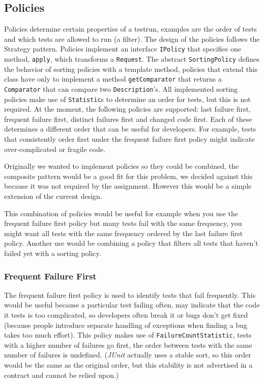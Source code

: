 \documentclass[i2]{oss}
\newcommand{\class}[1]{\texttt{#1}}
\newcommand{\method}[1]{\texttt{#1}}
\newcommand{\junit}{\emph{JUnit }}
\begin{document}

\subsection{Policies}
\label{subssec: Policies}

Policies determine certain properties of a testrun, examples are
the order of tests and which tests are allowed to run (a filter).
The design of the policies follows the Strategy pattern.
Policies implement an interface \class{IPolicy} that specifies one method,
\method{apply}, which transforms a \class{Request}.
The abstract \class{SortingPolicy} defines the behavior of sorting
policies with a template method, policies that extend this class have
only to implement a method \method{getComparator} that returns a 
\class{Comparator} that can compare two \class{Description}'s.
All implemented sorting policies make use of \class{Statistic}s to 
determine an order for tests, but this is not required.
At the moment, the following policies are supported: last failure first, 
frequent failure first, distinct failures first and changed code  first.
Each of these determines a different order that can be useful for
developers.
For example, tests that consistently order first under the frequent
failure first policy might indicate over-complicated or fragile code.

Originally we wanted to implement policies so they could be combined,
the composite pattern would be a good fit for this problem,
we decided against this because it was not required by the assignment.
However this would be a simple extension of the current design.

This combination of policies would be useful for example when you use
the frequent failure first policy but many tests fail with the
same frequency, you might want all tests with the same frequency ordered
by the last failure first policy.
Another use would be combining a policy that filters all tests that 
haven't failed yet with a sorting policy.

\subsubsection{Frequent Failure First}

The frequent failure first policy is used to identify tests that fail
frequently.
This would be useful because a particular test failing often, may 
indicate that the code it tests is too complicated, so developers often 
break it or bugs don't get fixed (because people introduce separate 
handling of exceptions when finding a bug takes too much effort).
This policy makes use of \class{FailureCountStatistic}, tests with a 
higher number of failures go first, the order between tests with the same 
number of failures is undefined.
(\junit actually uses a stable sort, so this order would be the same as 
the original order, but this stability is not advertised in a contract 
and cannot be relied upon.)
\end{document}
